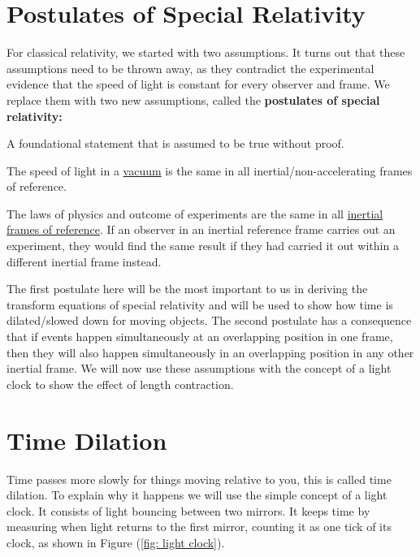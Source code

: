 \section{Postulates of Special Relativity} \label{sect: Postulates of Special Relativity}

For classical relativity, we started with two assumptions. It turns out that these assumptions need to be thrown away, as they contradict the experimental evidence that the speed of light is constant for every observer and frame. We replace them with two new assumptions, called the \textbf{postulates of special relativity:}

A foundational statement that is assumed to be true without proof.

\begin{mainpoints}
	\item The speed of light in a \hyperlink{def-vacuum}{vacuum} is the same in all inertial/non-accelerating frames of reference.
	\item The laws of physics and outcome of experiments are the same in all \hyperlink{def-Inertial-reference-frame}{inertial frames of reference}. If an observer in an inertial reference frame carries out an experiment, they would find the same result if they had carried it out within a different inertial frame instead.
\end{mainpoints}

The first postulate here will be the most important to us in deriving the transform equations of special relativity and will be used to show how time is dilated/slowed down for moving objects. The second postulate has a consequence that if events happen simultaneously at an overlapping position in one frame, then they will also happen simultaneously in an overlapping position in any other inertial frame.
We will now use these assumptions with the concept of a light clock to show the effect of length contraction.

\section{Time Dilation} \label{sect: Time Dilation}

Time passes more slowly for things moving relative to you, this is called time dilation.
To explain why it happens we will use the simple concept of a light clock.
It consists of light bouncing between two mirrors.
It keeps time by measuring when light returns to the first mirror, counting it as one tick of its clock, as shown in Figure (\ref{fig: light clock}).

